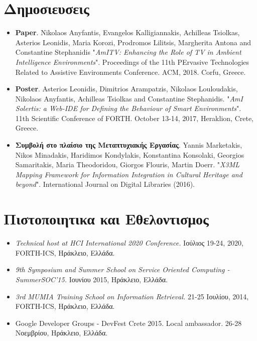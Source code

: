 \documentclass[11pt]{article}
\begin{document}
\section{Δημοσιευσεις}
\begin{itemize}
\item
\textbf{Paper}. Nikolaos Anyfantis, Evangelos Kalligiannakis, Achilleas Tsiolkas, Asterios Leonidis, Maria Korozi, Prodromos Lilitsis, Margherita Antona and Constantine Stephanidis "\textit{AmITV: Enhancing the Role of TV in Ambient Intelligence Environments}". Proceedings of the 11th PErvasive Technologies Related to Assistive Environments Conference. ACM, 2018. Corfu, Greece.

\item
\textbf{Poster}. Asterios Leonidis, Dimitrios Arampatzis, Nikolaos Louloudakis, Nikolaos Anyfantis, Achilleas Tsiolkas and Constantine Stephanidis. "\textit{AmI Solertis: a Web-IDE for Defining the Behaviour of Smart Environments}". 11th Scientific Conference of FORTH. October 13-14, 2017, Heraklion, Crete, Greece.

\item
\textbf{Συμβολή στο πλαίσιο της Μεταπτυχιακής Εργασίας}. Yannis Marketakis, Nikos Minadakis, Haridimos Kondylakis, Konstantina Konsolaki, Georgios Samaritakis, Maria Theodoridou, Giorgos Flouris, Martin Doerr. "\textit{X3ML Mapping Framework for Information Integration in Cultural Heritage and beyond}". International Journal on Digital Libraries (2016).
\end{itemize}

\section{Πιστοποιητικα και Εθελοντισμος}
\begin{itemize}
\item
\textit{Technical host at HCI International 2020 Conference.} Ιούλιος 19-24, 2020, FORTH-ICS, Ηράκλειο, Ελλάδα.
\item
\textit{9th Symposium and Summer School on Service Oriented Computing - SummerSOC'15.} Ιουνίου 2015, Ηράκλειο, Ελλάδα.
\item
\textit{3rd MUMIA Training School on Information Retrieval.} 21-25 Ιουλίου, 2014, FORTH-ICS, Ηράκλειο, Ελλάδα.
\item
Google Developer Groups - DevFest Crete 2015. Local ambassador. 26-28 Νοεμβρίου, Ηράκλειο, Ελλάδα. 
\end{itemize}
\end{document}
